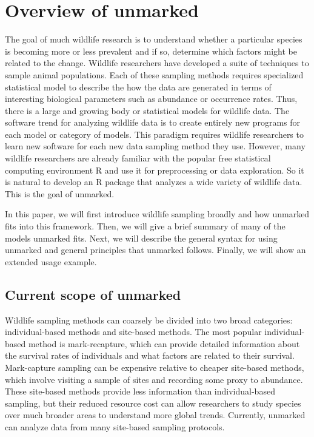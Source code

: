


\section{Overview of unmarked}

The goal of much wildlife research is to understand whether a
particular species is becoming more or less prevalent and if so,
determine which factors might be related to the change.  Wildlife
researchers have developed a suite of techniques to sample animal
populations.  Each of these sampling methods requires specialized
statistical model to describe the how the data are generated in terms
of interesting biological parameters such as abundance or occurrence
rates.  Thus, there is a large and growing body or statistical models
for wildlife data.  The software trend for analyzing wildlife data is
to create entirely new programs for each model or category of models.
This paradigm requires wildlife researchers to learn new software for
each new data sampling method they use.  However, many wildlife
researchers are already familiar with the popular free statistical
computing environment R \citep{R} and use it for preprocessing or
data exploration.  So it is natural to develop an R package that
analyzes a wide variety of wildlife data.  This is the goal of unmarked.

In this paper, we will first introduce wildlife sampling broadly and
how unmarked fits into this framework.  Then, we will
give a brief summary of many of the models unmarked fits.  Next, we
will describe the general syntax for using unmarked and general
principles that unmarked follows.  Finally, we will show an extended
usage example.

\subsection{Current scope of unmarked}

Wildlife sampling methods can coarsely be divided into two
broad categories: individual-based methods and site-based methods.
The most popular individual-based method is mark-recapture, which can
provide detailed information about the survival rates of individuals
and what factors are related to their survival.  Mark-capture sampling
can be expensive relative to cheaper site-based methods, which involve
visiting a sample of sites and recording some proxy to abundance.
These site-based methods provide less information than
individual-based sampling, but their reduced resource cost can allow
researchers to study species over much broader areas to understand
more global trends.  Currently, unmarked can analyze data from many
site-based sampling protocols.


